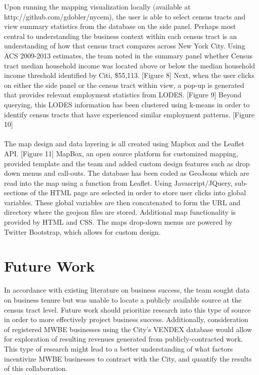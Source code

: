 \documentclass[article, 11pt]{article} %
\begin{document}
Upon running the mapping visualization locally (available at http://github.com/gdobler/nycem), the user is able to select census tracts and view summary statistics from the database on the side panel. Perhaps most central to understanding the business context within each census tract is an understanding of how that census tract compares across New York City. Using ACS 2009-2013 estimates, the team noted in the summary panel whether Census tract median household income was located above or below the median household income threshold identified by Citi, \$55,113. [Figure 8] Next, when the user clicks on either the side panel or the census tract within view, a pop-up is generated that provides relevant employment statistics from LODES. [Figure 9] Beyond querying, this LODES information has been clustered using k-means in order to identify census tracts that have experienced similar employment patterns. [Figure 10]
\\\\
The map design and data layering is all created using Mapbox and the Leaflet API. [Figure 11] MapBox, an open source platform for customized mapping, provided template and the team and added custom design features such as drop down menus and call-outs. The database has been coded as GeoJsons which are read into the map using a function from Leaflet. Using Javascript/JQuery, sub-sections of the HTML page are selected in order to store user clicks into global variables. These global variables are then concatenated to form the URL and directory where the geojson files are stored. Additional map functionality is provided by HTML and CSS. The maps drop-down menus are powered by Twitter Bootstrap, which allows for custom design.


\section*{Future Work}

In accordance with existing literature on business success, the team sought data on business tenure but was unable to locate a publicly available source at the census tract level. Future work should prioritize research into this type of source in order to more effectively project business success. Additionally, consideration of registered MWBE businesses using the City's VENDEX database would allow for exploration of resulting revenues generated from publicly-contracted work. This type of research might lead to a better understanding of what factors incentivize MWBE businesses to contract with the City, and quantify the results of this collaboration.
\end{document}
